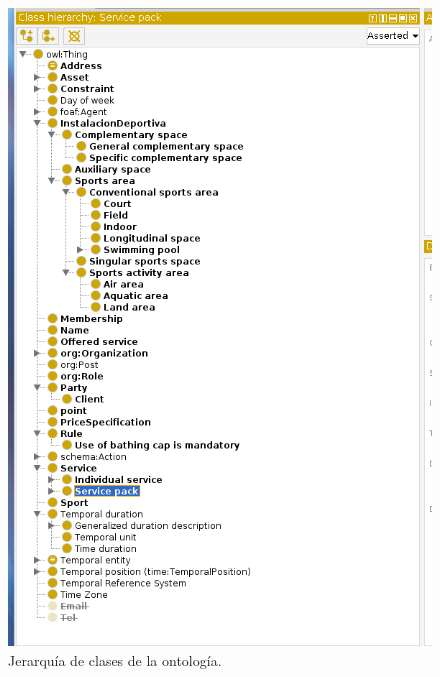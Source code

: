 \documentclass[a4paper,12pt]{article}
\begin{document}
	\begin{figure}[H]
		\centering
		\includegraphics[height=\textheight]{include/classes.png}
		\caption{Jerarquía de clases de la ontología.}
	\end{figure}
\end{document}
